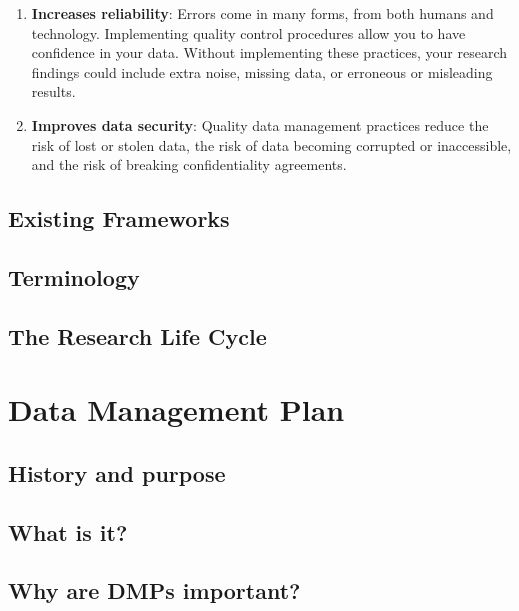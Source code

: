 \documentclass[
]{book}
\begin{document}
\begin{enumerate}
\item
  \textbf{Increases reliability}: Errors come in many forms, from both humans and technology. Implementing quality control procedures allow you to have confidence in your data. Without implementing these practices, your research findings could include extra noise, missing data, or erroneous or misleading results.
\item
  \textbf{Improves data security}: Quality data management practices reduce the risk of lost or stolen data, the risk of data becoming corrupted or inaccessible, and the risk of breaking confidentiality agreements.
\end{enumerate}

\hypertarget{existing-frameworks}{%
\section{Existing Frameworks}\label{existing-frameworks}}

\hypertarget{terminology}{%
\section{Terminology}\label{terminology}}

\hypertarget{the-research-life-cycle}{%
\section{The Research Life Cycle}\label{the-research-life-cycle}}

\hypertarget{dmp}{%
\chapter{Data Management Plan}\label{dmp}}

\hypertarget{history-and-purpose}{%
\section{History and purpose}\label{history-and-purpose}}

\hypertarget{what-is-it}{%
\section{What is it?}\label{what-is-it}}

\hypertarget{why-are-dmps-important}{%
\section{Why are DMPs important?}\label{why-are-dmps-important}}
\end{document}
